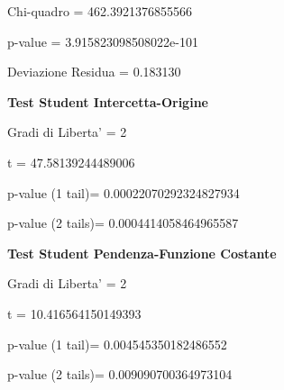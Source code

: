 \documentclass{article}
\begin{document}
Chi-quadro = 462.3921376855566

p-value = 3.915823098508022e-101

Deviazione Residua = 0.183130

\textbf{Test Student Intercetta-Origine}

Gradi di Liberta' = 2

t = 47.58139244489006

p-value (1 tail)= 0.00022070292324827934

p-value (2 tails)= 0.0004414058464965587

\textbf{Test Student Pendenza-Funzione Costante}

Gradi di Liberta' = 2

t = 10.416564150149393

p-value (1 tail)= 0.004545350182486552

p-value (2 tails)= 0.009090700364973104
\end{document}
